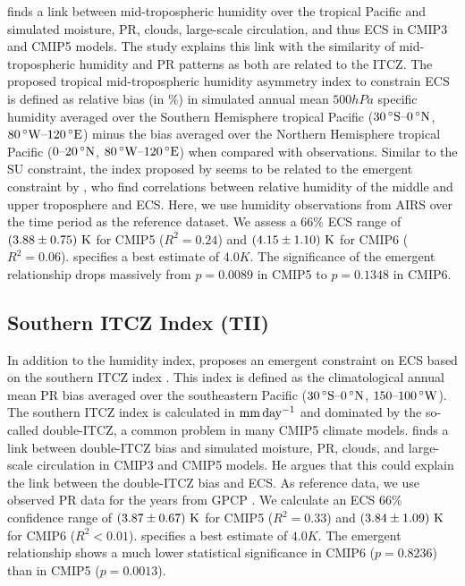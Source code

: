 \textcite{Tian2015} finds a link between mid-tropospheric humidity over the
tropical Pacific and simulated moisture, \acl{PR}, clouds, large-scale
circulation, and thus \ac{ECS} in \acs{CMIP}3 and \acs{CMIP}5 models. The study
explains this link with the similarity of mid-tropospheric humidity and
\acl{PR} patterns as both are related to the \ac{ITCZ}. The proposed tropical
mid-tropospheric humidity asymmetry index to constrain \ac{ECS} is defined as
relative bias (in $\si{\%}$) in simulated annual mean $500 \unit{hPa}$ specific
humidity averaged over the Southern Hemisphere tropical Pacific ($\range{30
  \unit{\degree S}}{0 \unit{\degree N}}$, $\range{80 \unit{\degree W}}{120
  \unit{\degree E}}$) minus the bias averaged over the Northern Hemisphere
tropical Pacific ($\rangeunit{0}{20}{\degree N}$, $\range{80 \unit{\degree
    W}}{120 \unit{\degree E}}$) when compared with observations. Similar to
the SU constraint, the index proposed by \textcite{Tian2015} seems to be
related to the emergent constraint by \textcite{Fasullo2012}, who find
correlations between relative humidity of the middle and upper troposphere and
\ac{ECS}. Here, we use humidity observations from AIRS \autocite{Aumann2003}
over the time period  as the reference dataset. We assess a
$66 \unit{\%}$ \ac{ECS} range of $\pmrangeunit{3.88}{0.75}{K}$ for \acs{CMIP}5
($R^2 = 0.24$) and $\pmrangeunit{4.15}{1.10}{K}$ for \acs{CMIP}6 ($R^2 =
0.06$). \Textcite{Tian2015} specifies a best estimate of $4.0 \unit{K}$. The
significance of the emergent relationship drops massively from $p = 0.0089$ in
\acs{CMIP}5 to $p = 0.1348$ in \acs{CMIP}6.


\subsection{Southern \acs{ITCZ} Index (TII)}
\label{subsec:05:tii}

In addition to the humidity index, \textcite{Tian2015} proposes an emergent
constraint on \ac{ECS} based on the southern \ac{ITCZ} index
\autocite{Bellucci2010, Hirota2011}. This index is defined as the
climatological annual mean \acl{PR} bias averaged over the southeastern Pacific
($\range{30 \unit{\degree S}}{0 \unit{\degree N}}$,
$\rangeunit{150}{100}{\degree W}$). The southern \ac{ITCZ} index is calculated
in $\si{\mmday{}}$ and dominated by the so-called double-\ac{ITCZ}, a common
problem in many \acs{CMIP}5 climate models. \Textcite{Tian2015} finds a link
between double-\ac{ITCZ} bias and simulated moisture, \acl{PR}, clouds, and
large-scale circulation in \acs{CMIP}3 and \acs{CMIP}5 models. He argues that
this could explain the link between the double-\acs{ITCZ} bias and \ac{ECS}. As
reference data, we use observed \acl{PR} data for the years 
from GPCP \autocite{Adler2003}. We calculate an \ac{ECS} $66 \unit{\%}$
confidence range of $\pmrangeunit{3.87}{0.67}{K}$ for \acs{CMIP}5 ($R^2 =
0.33$) and $\pmrangeunit{3.84}{1.09}{K}$ for \acs{CMIP}6 ($R^2 < 0.01$).
\Textcite{Tian2015} specifies a best estimate of $4.0 \unit{K}$. The emergent
relationship shows a much lower statistical significance in \acs{CMIP}6 ($p =
0.8236$) than in \acs{CMIP}5 ($p = 0.0013$).


